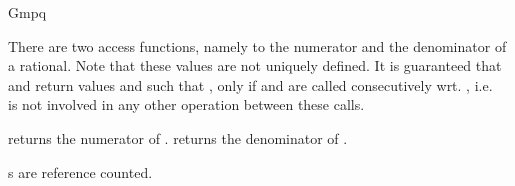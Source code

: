 \begin{ccRefClass} {Gmpq}

\ccOperations

There are two access functions, namely to the
numerator and the denominator of a rational.
Note that these values are not uniquely defined. 
It is guaranteed that  and 
 return values  and
 such that , only
if   and  are called
consecutively wrt. , i.e.~ is not involved in 
any other operation between these calls.


       {returns the numerator of .}
\ccGlue
{}
       {returns the denominator of .}

\ccImplementation
{}s are reference counted.

\end{ccRefClass} 
